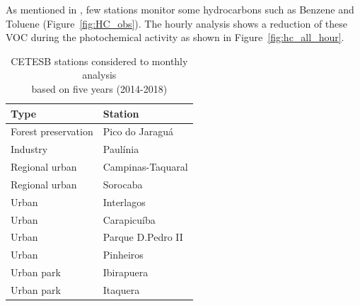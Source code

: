 	As mentioned in \citet{CETESB2019}, few stations monitor some hydrocarbons such as Benzene and Toluene (Figure~\ref{fig:HC_obs}).
	The hourly analysis shows a reduction of these VOC during the photochemical activity as shown in Figure~\ref{fig:hc_all_hour}.
  
  \begin{table}
	\centering
	\caption{CETESB stations considered to monthly analysis \\based on five years (2014-2018)}
	\label{tab:sta_year}
	\begin{tabular}{ll}
	\toprule
 	            Type &            Station \\
	\midrule
 Forest preservation &    Pico do Jaraguá \\
            Industry &           Paulínia \\
      Regional urban &  Campinas-Taquaral \\
      Regional urban &           Sorocaba \\
               Urban &         Interlagos \\
               Urban &        Carapicuíba \\
               Urban &  Parque D.Pedro II \\
               Urban &          Pinheiros \\
          Urban park &         Ibirapuera \\
          Urban park &           Itaquera \\
	\bottomrule
	\end{tabular}
   \end{table}
  

